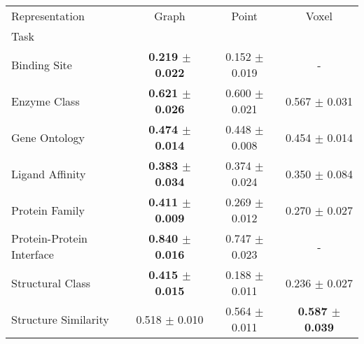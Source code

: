 \begin{tabular}{lccc}
\toprule
Representation & Graph & Point & Voxel \\
Task &  &  &  \\
\midrule
Binding Site & \textbf{0.219 $\pm$ 0.022} & 0.152 $\pm$ 0.019 & - \\
Enzyme Class & \textbf{0.621 $\pm$ 0.026} & 0.600 $\pm$ 0.021 & 0.567 $\pm$ 0.031 \\
Gene Ontology & \textbf{0.474 $\pm$ 0.014} & 0.448 $\pm$ 0.008 & 0.454 $\pm$ 0.014 \\
Ligand Affinity & \textbf{0.383 $\pm$ 0.034} & 0.374 $\pm$ 0.024 & 0.350 $\pm$ 0.084 \\
Protein Family & \textbf{0.411 $\pm$ 0.009} & 0.269 $\pm$ 0.012 & 0.270 $\pm$ 0.027 \\
Protein-Protein Interface & \textbf{0.840 $\pm$ 0.016} & 0.747 $\pm$ 0.023 & - \\
Structural Class & \textbf{0.415 $\pm$ 0.015} & 0.188 $\pm$ 0.011 & 0.236 $\pm$ 0.027 \\
Structure Similarity & 0.518 $\pm$ 0.010 & 0.564 $\pm$ 0.011 & \textbf{0.587 $\pm$ 0.039} \\
\bottomrule
\end{tabular}
